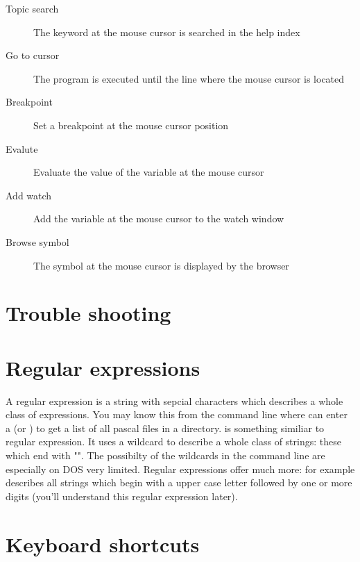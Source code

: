 \begin{description}
\item [Topic search] The keyword at the mouse cursor is searched in the
help index
\item [Go to cursor] The program is executed until the line where
the mouse cursor is located
\item [Breakpoint] Set a breakpoint at the mouse cursor position
\item [Evalute] Evaluate the value of the variable at the mouse
cursor
\item [Add watch] Add the variable at the mouse cursor to the
watch window
\item [Browse symbol] The symbol at the mouse cursor is displayed
by the browser
\end{description}


\section{Trouble shooting}

\section{Regular expressions}
\label{ide:regexpr}
A regular expression is a string with sepcial characters which describes 
a whole class of expressions. You may know this from the command line
where can enter a  (or ) to get a list
of all pascal files in a directory.  is something 
similiar to regular expression. It uses a wildcard to describe a whole 
class of strings: these which end with "". The possibilty 
of the wildcards in the command line are especially on DOS very limited. 
Regular expressions offer much more: for example \file{[A-Z][0-9]+} 
describes all strings which begin with a upper case letter followed by
one or more digits (you'll understand this regular expression later).


\section{Keyboard shortcuts}
\label{ide:keyshortcuts}


